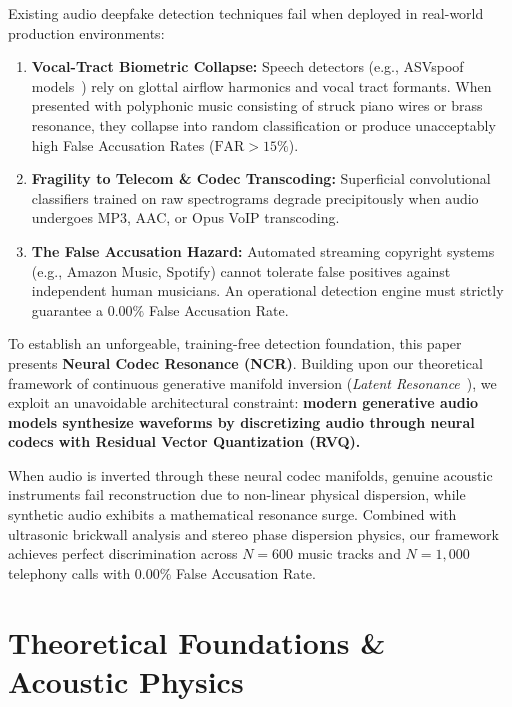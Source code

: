 \documentclass[conference]{IEEEtran}
\theoremstyle{definition}
\begin{document}
Existing audio deepfake detection techniques fail when deployed in real-world production environments:
\begin{enumerate}
    \item \textbf{Vocal-Tract Biometric Collapse:} Speech detectors (e.g., ASVspoof models~\cite{yamagishi2021asvspoof}) rely on glottal airflow harmonics and vocal tract formants. When presented with polyphonic music consisting of struck piano wires or brass resonance, they collapse into random classification or produce unacceptably high False Accusation Rates ($\text{FAR} > 15\%$).
    \item \textbf{Fragility to Telecom \& Codec Transcoding:} Superficial convolutional classifiers trained on raw spectrograms degrade precipitously when audio undergoes MP3, AAC, or Opus VoIP transcoding.
    \item \textbf{The False Accusation Hazard:} Automated streaming copyright systems (e.g., Amazon Music, Spotify) cannot tolerate false positives against independent human musicians. An operational detection engine must strictly guarantee a $0.00\%$ False Accusation Rate.
\end{enumerate}

To establish an unforgeable, training-free detection foundation, this paper presents \textbf{Neural Codec Resonance (NCR)}. Building upon our theoretical framework of continuous generative manifold inversion (\textit{Latent Resonance}~\cite{bandyopadhyay2027latent}), we exploit an unavoidable architectural constraint: \textbf{modern generative audio models synthesize waveforms by discretizing audio through neural codecs with Residual Vector Quantization (RVQ).}

When audio is inverted through these neural codec manifolds, genuine acoustic instruments fail reconstruction due to non-linear physical dispersion, while synthetic audio exhibits a mathematical resonance surge. Combined with ultrasonic brickwall analysis and stereo phase dispersion physics, our framework achieves perfect discrimination across $N=600$ music tracks and $N=1,000$ telephony calls with $0.00\%$ False Accusation Rate.

\section{Theoretical Foundations \& Acoustic Physics}
\end{document}

